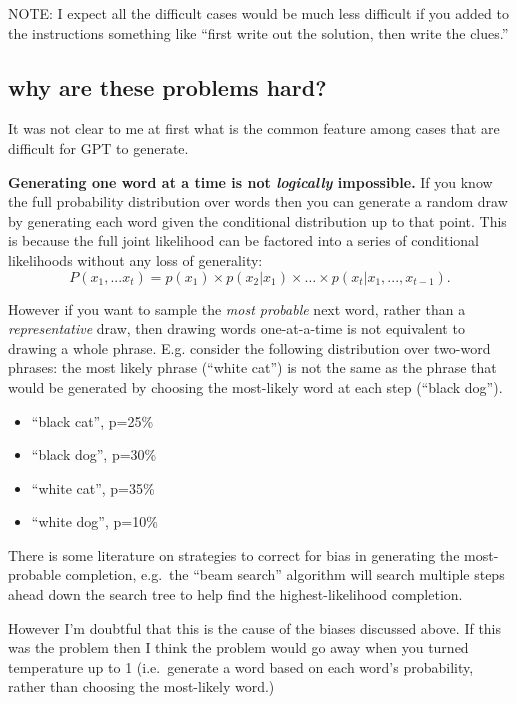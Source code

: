 \documentclass[
  11pt,
  letterpaper,
  DIV=11,
  numbers=noendperiod,
  oneside]{scrartcl}
\providecommand{\tightlist}{%
  \setlength{\itemsep}{0pt}\setlength{\parskip}{0pt}}\usepackage{longtable,booktabs,array}
\begin{document}
NOTE: I expect all the difficult cases would be much less difficult if
you added to the instructions something like ``first write out the
solution, then write the clues.''

\hypertarget{why-are-these-problems-hard}{%
\subsection{why are these problems
hard?}\label{why-are-these-problems-hard}}

It was not clear to me at first what is the common feature among cases
that are difficult for GPT to generate.

\textbf{Generating one word at a time is not \emph{logically}
impossible.} If you know the full probability distribution over words
then you can generate a random draw by generating each word given the
conditional distribution up to that point. This is because the full
joint likelihood can be factored into a series of conditional
likelihoods without any loss of generality:
\[P(x_1,...x_t)=p(x_1)\times p(x_2|x_1)\times \ldots \times p(x_t|x_1,...,x_{t-1}).\]

However if you want to sample the \emph{most probable} next word, rather
than a \emph{representative} draw, then drawing words one-at-a-time is
not equivalent to drawing a whole phrase. E.g. consider the following
distribution over two-word phrases: the most likely phrase (``white
cat'') is not the same as the phrase that would be generated by choosing
the most-likely word at each step (``black dog'').

\begin{itemize}
\tightlist
\item
  ``black cat'', p=25\%
\item
  ``black dog'', p=30\%
\item
  ``white cat'', p=35\%
\item
  ``white dog'', p=10\%
\end{itemize}

There is some literature on strategies to correct for bias in generating
the most-probable completion, e.g.~the ``beam search'' algorithm will
search multiple steps ahead down the search tree to help find the
highest-likelihood completion.

However I'm doubtful that this is the cause of the biases discussed
above. If this was the problem then I think the problem would go away
when you turned temperature up to 1 (i.e.~generate a word based on each
word's probability, rather than choosing the most-likely word.)
\end{document}
